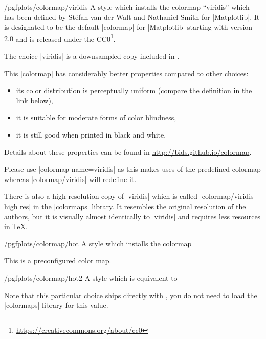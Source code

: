 \begin{stylekey}{/pgfplots/colormap/viridis}
	A style which installs the colormap ``viridis'' which has been defined by St\'efan van der Walt and Nathaniel Smith for |Matplotlib|. It is designated to be the default |colormap| for |Matplotlib| starting with version~$2.0$ and is released under the CC0\footnote{\url{https://creativecommons.org/about/cc0}}. 

	The choice |viridis| is a downsampled copy included in \PGFPlots.

\begin{codeexample}
\pgfplotsset{
	colormap name=viridis,
}
\end{codeexample}

	This |colormap| has considerably better properties compared to other choices:
	\begin{itemize} 
	\item its color distribution is perceptually uniform (compare the definition in the link below),
	\item it is suitable for moderate forms of color blindness,
	\item it is still good when printed in black and white.
	\end{itemize}
	Details about these properties can be found in \url{http://bids.github.io/colormap}.

	Please use |colormap name=viridis| as this makes uses of the predefined colormap whereas |colormap/viridis| will redefine it.

	There is also a high resolution copy of |viridis| which is called |colormap/viridis high res| in the |colormaps| library. It resembles the original resolution of the authors, but it is visually almost identically to |viridis| and requires less resources in \TeX.
\end{stylekey}

\begin{stylekey}{/pgfplots/colormap/hot}
	A style which installs the colormap
\begin{codeexample}
\end{codeexample}


	This is a preconfigured color map.
\end{stylekey}

\begin{stylekey}{/pgfplots/colormap/hot2}
	A style which is equivalent to 
\begin{codeexample}
\end{codeexample}


	Note that this particular choice ships directly with \PGFPlots, you do not need to load the |colormaps| library for this value.

	\matlabcolormaptext
\end{stylekey}

